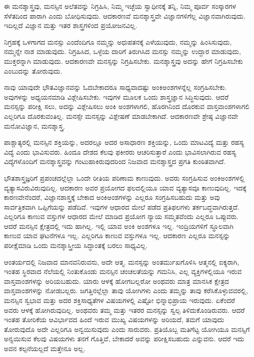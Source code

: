 ಈ ಮನಶ್ಶಾಸ್ತ್ರವು, ಮನಸ್ಸಿನ ಅಲೆತವನ್ನು ನಿಗ್ರಹಿಸಿ, ನಿಮ್ಮ ಇಚ್ಛೆಯ ಸ್ವಾಧೀನಕ್ಕೆ ತನ್ನಿ, ನಿಮ್ಮ ಪೂರ್ವ ಸಂಸ್ಕಾರಗಳ ಸೆಳೆತದಿಂದ ಪಾರಾಗಿ ಎಂದು ಬೋಧಿಸುವುದು. ಆದಕಾರಣವೆ ಮನಶ್ಶಾಸ್ತ್ರವೇ ವಿಜ್ಞಾನಗಳಿಗೆಲ್ಲ ವಿಜ್ಞಾನವಾಗಿರುವುದು. ಇದಿಲ್ಲದೆ ವಿಜ್ಞಾನ ಮತ್ತು ಇತರ ಶಾಸ್ತ್ರಗಳಿಂದ ಪ್ರಯೋಜನವಿಲ್ಲ.

ನಿಗ್ರಹಕ್ಕೆ ಒಳಗಾಗದ ಮನಸ್ಸು ಎಂದೆಂದಿಗೂ ನಮ್ಮನ್ನು ಅಧಃಪತನಕ್ಕೆ ಎಳೆಯುವುದು, ನಮ್ಮನ್ನು ಹಿಂಸಿಸುವುದು, ನಮ್ಮನ್ನೇ ನಾಶ ಮಾಡುವುದು. ನಿಗ್ರಹಿಸಿದ, ಒಳ್ಳೆಯ ದಾರಿಗೆ ತಿರುಗಿಸಿದ ಮನಸ್ಸು ನಮ್ಮನ್ನು ಉದ್ದಾರ ಮಾಡುವುದು, ಮುಕ್ತರನ್ನಾಗಿ ಮಾಡುವುದು. ಆದಕಾರಣವೇ ಮನಸ್ಸನ್ನು ನಿಗ್ರಹಿಸಬೇಕು. ಮನಶ್ಶಾಸ್ತ್ರವು ಅದನ್ನು ಹೇಗೆ ನಿಗ್ರಹಿಸಬೇಕು ಎಂಬುದನ್ನು ತೋರುವುದು.

ನಾವು ಯಾವುದೇ ಭೌತವಿಜ್ಞಾನವನ್ನು ಓದಬೇಕಾದರೂ ಸಾಧ್ಯವಾದಷ್ಟು ಅಂಕಿಅಂಶಗಳನ್ನೆಲ್ಲ ಸಂಗ್ರಹಿಸಬೇಕು. ಅವುಗಳನ್ನು ಅಧ್ಯಯನಮಾಡಿ ವಿಶ್ಲೇಷಿಸಬೇಕು. ಇವುಗಳ ಮೂಲಕ ಒಂದು ಶಾಸ್ತ್ರಜ್ಞಾನ ಸಿದ್ಧಿಸುವುದು. ಆದರೆ ಮನಸ್ಸನ್ನು ಪರೀಕ್ಷಿ ಸಲು, ಅದನ್ನು ವಿಶ್ಲೇಷಿಸಲು ಅಂಕಿ ಅಂಶಗಳಾಗಲಿ, ಹೊರಗಿನಿಂದ ದೊರಕುವ ವಾಸ್ತವಾಂಶಗಳಾಗಲಿ ಎಲ್ಲರಿಗೂ ದೊರಕುವಂತಿಲ್ಲ. ಮನಸ್ಸೇ ಮನಸ್ಸನ್ನು ವಿಶ್ಲೇಷಣೆ ಮಾಡಬೇಕಾಗಿದೆ. ಆದಕಾರಣವೇ ಶ್ರೇಷ್ಠ ವಿಜ್ಞಾನವೇ ಮನೋವಿಜ್ಞಾನ, ಮನಶ್ಶಾಸ್ತ್ರ.

ಪಾಶ್ಚಾತ್ಯರಲ್ಲಿ ಮನಸ್ಸಿನ ಶಕ್ತಿಯನ್ನು, ಅದರಲ್ಲೂ ಅದರ ಅಸಾಧಾರಣ ಶಕ್ತಿಯನ್ನು, ಒಂದು ಮಾಟವಿದ್ಯೆ ಮತ್ತು ರಹಸ್ಯ ವಿದ್ಯೆ ಎಂದು ಭಾವಿಸುವರು. ಹಿಂದೂ ದೇಶದ ಕೆಲವು ಫಕೀರರು ಆಚರಿಸುತ್ತಾರೆ ಎಂದು ಭಾವಿಸಲಾಗಿರುವ ರಹಸ್ಯ ವಿದ್ಯೆಗಳೊಂದಿಗೆ ಮನಶ್ಶಾಸ್ತ್ರವನ್ನು ಗಂಟುಹಾಕಿರುವುದರಿಂದ ನಿಜವಾದ ಮನಶ್ಶಾಸ್ತ್ರದ ಪ್ರಗತಿ ಕುಂಠಿತವಾಗಿದೆ.

ಭೌತಶಾಸ್ತ್ರಜ್ಞರಿಗೆ ಪ್ರಪಂಚದಲ್ಲೆಲ್ಲಾ ಒಂದೇ ರೀತಿಯ ಪರಿಣಾಮ ಕಾಣುವುದು. ಅವರು ಸಂಗ್ರಹಿಸುವ ಅಂಕಿಅಂಶಗಳಲ್ಲಿ ವ್ಯತ್ಯಾಸವಿರುವಿರುವುದಿಲ್ಲ. ಆದಕಾರಣ ಅವರ ಪ್ರಯೋಗದ ಫಲದಲ್ಲಿಯೂ ಯಾವ ವ್ಯತ್ಯಾಸವೂ ಕಾಣುವುದಿಲ್ಲ. ಇದಕ್ಕೆ ಕಾರಣವೇನೆಂದರೆ, ವಿಜ್ಞಾನಶಾಸ್ತ್ರಕ್ಕೆ ಬೇಕಾದ ಅಂಕಿಅಂಶಗಳನ್ನು ಎಲ್ಲರೂ ಸಂಗ್ರಹಿಸಬಹುದು ಮತ್ತು ಅವು ಸಾರ್ವತ್ರಿಕವಾಗಿ ಒಪ್ಪಿಗೆಯನ್ನು ಪಡೆದಿವೆ. ಇವುಗಳ ಆಧಾರದ ಮೇಲೆ ಪಡೆದ ಪ್ರತಿಫಲಗಳು ತರ್ಕಬದ್ಧವಾಗಿರುತ್ತದೆ. ಎಲ್ಲರಿಗೂ ಕಾಣುವ ವಸ್ತುಗಳ ಆಧಾರದ ಮೇಲೆ ಮಾಡಿದ ಪ್ರಯೋಗ ನ್ಯಾಯ ಸಮ್ಮತವೆಂದು ಎಲ್ಲರೂ ಒಪ್ಪುವರು. ಆದರೆ ಮನಸ್ಸಿನ ಕ್ಷೇತ್ರದಲ್ಲಿ ಇದು ಹಾಗಿಲ್ಲ. ಇಲ್ಲಿ ಯಾವ ಅಂಕಿ ಅಂಶಗಳೂ ಇಲ್ಲ. ಇಂದ್ರಿಯಗಳಿಗೆ ಸ್ಥೂಲವಾಗಿ ಕಾಣುವ ಯಾವ ಘಟನೆಗಳೂ ಇಲ್ಲ. ಎಲ್ಲರಿಗೂ ಕಾಣುವ ವಸ್ತುಗಳೂ ಇಲ್ಲ. ಆದಕಾರಣ ಎಲ್ಲರೂ ಮನಸ್ಸನ್ನು ಪರೀಕ್ಷೆಮಾಡಿ ಒಂದು ಮನಶ್ಶಾಸ್ತ್ರೀಯ ಸಿದ್ಧಾಂತಕ್ಕೆ ಬರಲು ಸಾಧ್ಯವಿಲ್ಲ.

ಆಂತರ್ಯದಲ್ಲಿ ನಿಜವಾದ ಮಾನವನಿರುವನು, ಅದೇ ಆತ್ಮ. ಮನಸ್ಸನ್ನು ಅಂತರ್ಮುಖಗೊಳಿಸಿ ಆತ್ಮನಲ್ಲಿ ಐಕ್ಯರಾಗಿ, ಇಂತಹ ಸ್ಥಿರವಾದ ನೆಲೆಯಲ್ಲಿ ನಿಂತುಕೊಂಡು ಮನಸ್ಸಿನ ಚಂಚಲತೆಯನ್ನು ಗಮನಿಸಿ, ಎಲ್ಲ ವ್ಯಕ್ತಿಗಳಲ್ಲಿಯೂ ಇರುವ ವಾಸ್ತವಾಂಶಗಳನ್ನು ಅರಿಯಬಹುದು. ಯಾರು ಆಳಕ್ಕೆ ಹೋಗಬಲ್ಲರೋ ಅಂಥವರು ಮಾತ್ರ ಮಾನಸಿಕ ಕ್ಷೇತ್ರದ ವಾಸ್ತವಾಂಶಗಳನ್ನು ನೋಡಬಲ್ಲರು. ಜಗತ್ತಿನಲ್ಲೆಲ್ಲಾ ತಾವು ಯೋಗಿಗಳು ಎಂದು ತಮ್ಮನ್ನು ತಾವು ಕರೆಸಿಕೊಳ್ಳುವವರಲ್ಲಿ, ಮನಸ್ಸಿನ ಸ್ವಭಾವ ಮತ್ತು ಅದರ ಶಕ್ತಿಸಾಧ್ಯತೆಗಳ ವಿಷಯಗಳಲ್ಲಿ ಎಷ್ಟೋ ಭಿನ್ನಾಭಿಪ್ರಾಯ ಇರುವುದು. ಏಕೆಂದರೆ ಅವರು ಆಳಕ್ಕೆ ಹೋಗಿರುವುದಿಲ್ಲ. ಅಂಥವರು ತಮ್ಮ ಮತ್ತು ಇತರರ ಮನಸ್ಸನ್ನು ಸ್ವಲ್ಪ ತಿಳಿದುಕೊಂಡಿರುವರು. ಆದರೆ ಇಂತಹ ತೋರಿಕೆಯ ಆವಿರ್ಭಾವದ ಹಿಂದೆ ಇರುವ ಮುಖ್ಯ ವಿಷಯಗಳನ್ನು ಅರಿಯದೆ, ತಮಗೆ ಯಾವುದು ತೋರುವುದೊ ಅದೇ ಎಲ್ಲರಿಗೂ ಅನ್ವಯಿಸುವುದು ಎಂದು ಸಾರುವರು. ಪ್ರತಿಯೊಬ್ಬ ಮತಿಗೆಟ್ಟ ಯೋಗಿಯೂ ಮನಸ್ಸಿಗೆ ಅನ್ವಯಿಸುವ ಕೆಲವು ವಿಷಯಗಳು ತನಗೆ ಗೊತ್ತಿವೆ, ಬೇಕಾದರೆ ಅವನ್ನು ಪರೀಕ್ಷಿಸಬಹುದು ಎನ್ನುವನು. ಆದರೆ ಇದು ಅವನ ಕಲ್ಪನೆಯಲ್ಲದೆ ಮತ್ತೇನೂ ಅಲ್ಲ.

